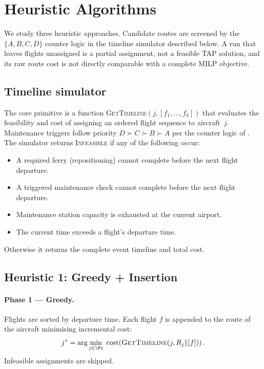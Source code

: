 \section{Heuristic Algorithms}
\label{sec:heuristics}

We study three heuristic approaches. Candidate routes are screened by the
$\{A,B,C,D\}$ counter logic in the timeline simulator described below. A run
that leaves flights unassigned is a partial assignment, not a feasible TAP
solution, and its raw route cost is not directly comparable with a complete
MILP objective.

\subsection{Timeline simulator}

The core primitive is a function \textsc{GetTimeline}$(j, [f_1,\ldots,f_k])$
that evaluates the feasibility and cost of assigning an ordered flight sequence
to aircraft~$j$.  Maintenance triggers follow priority $D \succ C \succ B
\succ A$ per the counter logic of .  The simulator returns
\textsc{Infeasible} if any of the following occur:
\begin{itemize}
  \item A required ferry (repositioning) cannot complete before the next flight
    departure.
  \item A triggered maintenance check cannot complete before the next flight
    departure.
  \item Maintenance station capacity is exhausted at the current airport.
  \item The current time exceeds a flight's departure time.
\end{itemize}
Otherwise it returns the complete event timeline and total cost.

\subsection{Heuristic 1: Greedy + Insertion}

\paragraph{Phase 1 — Greedy.}
Flights are sorted by departure time.  Each flight $f$ is appended to the
route of the aircraft minimising incremental cost:
\begin{equation}
  j^* = \arg\min_{j \in \Pc}\;
  \mathrm{cost}\!\left(\textsc{GetTimeline}(j, R_j \Vert [f])\right).
\end{equation}
Infeasible assignments are skipped.

